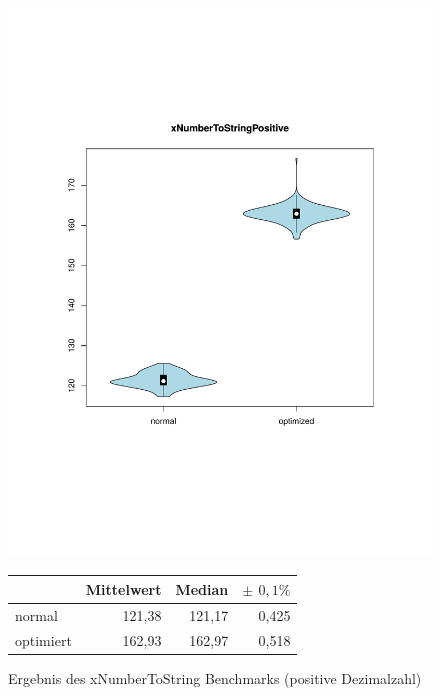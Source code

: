 \begin{figure}[H]
{		\includegraphics[trim=20mm 60mm 0mm 50mm,scale=0.50]{pictures/vioplot_xNumberToStringPositive.pdf}
	}
	\begin{table}[H]
	\centering
		\begin{tabular}{|l|r|r|r|}
			\hline
		   		 	  & Mittelwert & Median & \bf{$\pm$ $0,1\%$} \\
		 	\hline
		 	\hline
		  	normal 	  & 121,38 & 121,17 & 0,425 \\
		 	optimiert & 162,93 & 162,97 & 0,518 \\ 
		  	\hline
		  	
		\end{tabular}
	\end{table}

	\caption{Ergebnis des xNumberToString Benchmarks (positive Dezimalzahl)}\label{bp:instURIBench}
\end{figure}



